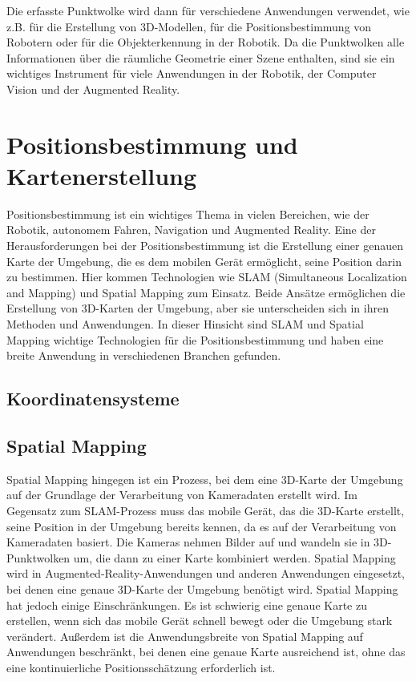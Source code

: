 Die erfasste Punktwolke wird dann für verschiedene Anwendungen verwendet, wie z.B. für die Erstellung von 3D-Modellen, für die Positionsbestimmung von Robotern oder für die Objekterkennung in der Robotik. Da die Punktwolken alle Informationen über die räumliche Geometrie einer Szene enthalten, sind sie ein wichtiges Instrument für viele Anwendungen in der Robotik, der Computer Vision und der Augmented Reality.


\section{Positionsbestimmung und Kartenerstellung}
Positionsbestimmung ist ein wichtiges Thema in vielen Bereichen, wie der Robotik, autonomem Fahren, Navigation und Augmented Reality. Eine der Herausforderungen bei der Positionsbestimmung ist die Erstellung einer genauen Karte der Umgebung, die es dem mobilen Gerät ermöglicht, seine Position darin zu bestimmen. Hier kommen Technologien wie SLAM (Simultaneous Localization and Mapping) und Spatial Mapping zum Einsatz. Beide Ansätze ermöglichen die Erstellung von 3D-Karten der Umgebung, aber sie unterscheiden sich in ihren Methoden und Anwendungen. In dieser Hinsicht sind SLAM und Spatial Mapping wichtige Technologien für die Positionsbestimmung und haben eine breite Anwendung in verschiedenen Branchen gefunden.

    \subsection{Koordinatensysteme}

    \cite[vgl. ]{SWB-1841134112}


    
    \subsection{Spatial Mapping} \label{spatial_mapping:subsection}
    Spatial Mapping hingegen ist ein Prozess, bei dem eine 3D-Karte der Umgebung auf der Grundlage der Verarbeitung von Kameradaten erstellt wird. Im Gegensatz zum SLAM-Prozess muss das mobile Gerät, das die 3D-Karte erstellt, seine Position in der Umgebung bereits kennen, da es auf der Verarbeitung von Kameradaten basiert. Die Kameras nehmen Bilder auf und wandeln sie in 3D-Punktwolken um, die dann zu einer Karte kombiniert werden. Spatial Mapping wird in Augmented-Reality-Anwendungen und anderen Anwendungen eingesetzt, bei denen eine genaue 3D-Karte der Umgebung benötigt wird.
    Spatial Mapping hat jedoch einige Einschränkungen.
    Es ist schwierig eine genaue Karte zu erstellen, wenn sich das mobile Gerät schnell bewegt oder die Umgebung stark verändert. Außerdem ist die Anwendungsbreite von Spatial Mapping auf Anwendungen beschränkt, bei denen eine genaue Karte ausreichend ist, ohne das eine kontinuierliche Positionsschätzung erforderlich ist.
   
